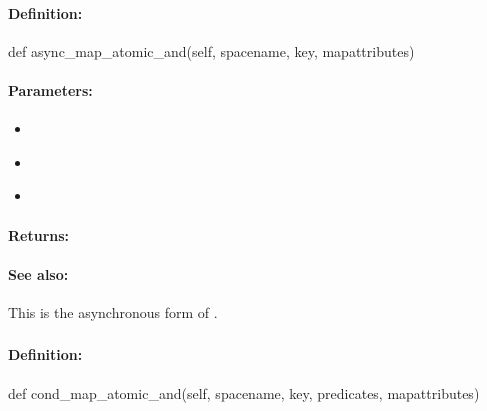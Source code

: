 \paragraph{Definition:}
\begin{pythoncode}
def async_map_atomic_and(self, spacename, key, mapattributes)
\end{pythoncode}

\paragraph{Parameters:}
\begin{itemize}[noitemsep]
\item {}\\

\item {}\\

\item {}\\

\end{itemize}

\paragraph{Returns:}


\paragraph{See also:}  This is the asynchronous form of .

\pagebreak
\subsubsection{}
\label{api:python:cond_map_atomic_and}


\paragraph{Definition:}
\begin{pythoncode}
def cond_map_atomic_and(self, spacename, key, predicates, mapattributes)
\end{pythoncode}


